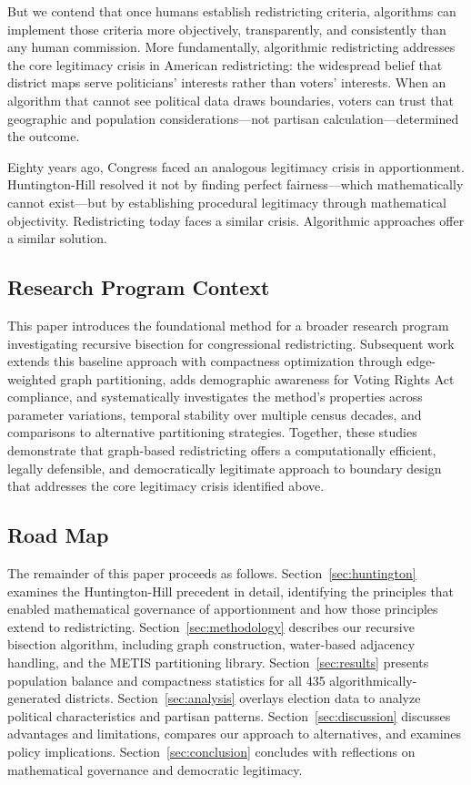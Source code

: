 But we contend that once humans establish redistricting criteria, algorithms can implement those criteria more objectively, transparently, and consistently than any human commission. More fundamentally, algorithmic redistricting addresses the core legitimacy crisis in American redistricting: the widespread belief that district maps serve politicians' interests rather than voters' interests. When an algorithm that cannot see political data draws boundaries, voters can trust that geographic and population considerations—not partisan calculation—determined the outcome.

Eighty years ago, Congress faced an analogous legitimacy crisis in apportionment. Huntington-Hill resolved it not by finding perfect fairness—which mathematically cannot exist—but by establishing procedural legitimacy through mathematical objectivity. Redistricting today faces a similar crisis. Algorithmic approaches offer a similar solution.

\subsection{Research Program Context}

This paper introduces the foundational method for a broader research program investigating recursive bisection for congressional redistricting. Subsequent work extends this baseline approach with compactness optimization through edge-weighted graph partitioning, adds demographic awareness for Voting Rights Act compliance, and systematically investigates the method's properties across parameter variations, temporal stability over multiple census decades, and comparisons to alternative partitioning strategies. Together, these studies demonstrate that graph-based redistricting offers a computationally efficient, legally defensible, and democratically legitimate approach to boundary design that addresses the core legitimacy crisis identified above.

\subsection{Road Map}

The remainder of this paper proceeds as follows. Section~\ref{sec:huntington} examines the Huntington-Hill precedent in detail, identifying the principles that enabled mathematical governance of apportionment and how those principles extend to redistricting. Section~\ref{sec:methodology} describes our recursive bisection algorithm, including graph construction, water-based adjacency handling, and the METIS partitioning library. Section~\ref{sec:results} presents population balance and compactness statistics for all 435 algorithmically-generated districts. Section~\ref{sec:analysis} overlays election data to analyze political characteristics and partisan patterns. Section~\ref{sec:discussion} discusses advantages and limitations, compares our approach to alternatives, and examines policy implications. Section~\ref{sec:conclusion} concludes with reflections on mathematical governance and democratic legitimacy.
